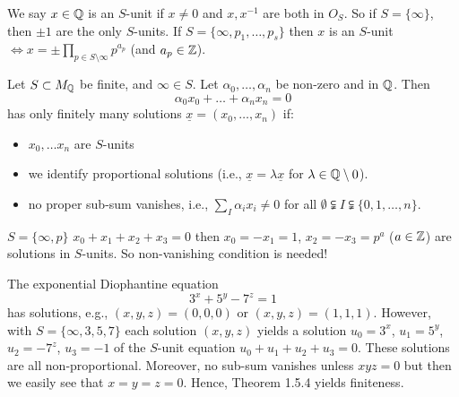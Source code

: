 \documentclass[NumTh.tex]{subfiles}
\begin{document}
We say $x \in \mathbb{Q}$ is an $S$-unit if $x \neq 0$ and $x, x^{-1}$ are both in $O_S$.
So if $S = \{ \infty \}$, then $\pm 1$ are the only $S$-units. If $S = \{ \infty,p_1,\dots,p_s \}$ then $x$ is an $S$-unit $\iff x = \pm \prod_{p \in S \setminus \infty} p^{a_p}$ (and $a_p \in \mathbb{Z}$).

\begin{theorem}
  Let $S \subset M_{\mathbb{Q}}$ be finite, and $\infty \in S$. Let $\alpha_0,\dots,\alpha_n$ be non-zero and in $\mathbb{Q}$.
  Then 
  \[ \alpha_0 x_0 + \dots + \alpha_n x_n = 0 \]
  has only finitely many solutions $\underline{x} = (x_0,\dots,x_n)$ if:
  \begin{itemize}
    \item $x_0,\dots x_n$ are $S$-units
    \item we identify proportional solutions (i.e., $\underline{x} = \lambda \underline{x}$ for $ \lambda \in \mathbb{Q} \setminus 0$).
    \item no proper sub-sum vanishes, i.e., $\sum_{I} \alpha_i x_i \neq 0$ for all $\emptyset \subsetneqq I \subsetneqq \{0,1,\dots,n\}$.
  \end{itemize}
\end{theorem}

\begin{rem}
  $S = \{\infty, p \}$ $x_0+x_1+x_2+x_3 = 0$ then $x_0 = - x_1 =  1$, $x_2 = - x_3 = p^a$ ($a \in \mathbb{Z}$)
  are solutions in $S$-units. So non-vanishing condition is needed!
\end{rem}

\begin{ex}
  The exponential Diophantine equation 
  \[ 3^x + 5^y - 7^z = 1 \]
  has solutions, e.g., $(x,y,z) = (0,0,0)$ or $(x,y,z) = (1,1,1)$.
  However, with $S = \{ \infty,3,5,7 \}$ each solution $(x,y,z)$ yields a solution $u_0 = 3^x$, $u_1 = 5^y$, $u_2 = - 7^z$, $u_3 = - 1$ of the $S$-unit equation $u_0 + u_1 + u_2 + u_3 = 0$.
  These solutions are all non-proportional.
  Moreover, no sub-sum vanishes unless $x y z = 0$ but then we easily see that $x=y=z=0$.
  Hence, Theorem 1.5.4 yields finiteness.
\end{ex}
\end{document}
